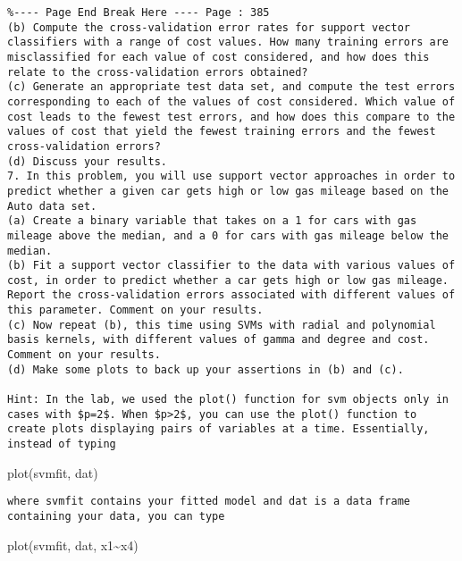 \documentclass[10pt]{article}
\begin{document}
\begin{verbatim}
%---- Page End Break Here ---- Page : 385
(b) Compute the cross-validation error rates for support vector classifiers with a range of cost values. How many training errors are misclassified for each value of cost considered, and how does this relate to the cross-validation errors obtained?
(c) Generate an appropriate test data set, and compute the test errors corresponding to each of the values of cost considered. Which value of cost leads to the fewest test errors, and how does this compare to the values of cost that yield the fewest training errors and the fewest cross-validation errors?
(d) Discuss your results.
7. In this problem, you will use support vector approaches in order to predict whether a given car gets high or low gas mileage based on the Auto data set.
(a) Create a binary variable that takes on a 1 for cars with gas mileage above the median, and a 0 for cars with gas mileage below the median.
(b) Fit a support vector classifier to the data with various values of cost, in order to predict whether a car gets high or low gas mileage. Report the cross-validation errors associated with different values of this parameter. Comment on your results.
(c) Now repeat (b), this time using SVMs with radial and polynomial basis kernels, with different values of gamma and degree and cost. Comment on your results.
(d) Make some plots to back up your assertions in (b) and (c).

Hint: In the lab, we used the plot() function for svm objects only in cases with $p=2$. When $p>2$, you can use the plot() function to create plots displaying pairs of variables at a time. Essentially, instead of typing
\end{verbatim}

\begin{displayquote}
plot(svmfit, dat)
\end{displayquote}

\begin{verbatim}
where svmfit contains your fitted model and dat is a data frame containing your data, you can type
\end{verbatim}

\begin{displayquote}
plot(svmfit, dat, x1\~{}x4)
\end{displayquote}
\end{document}
